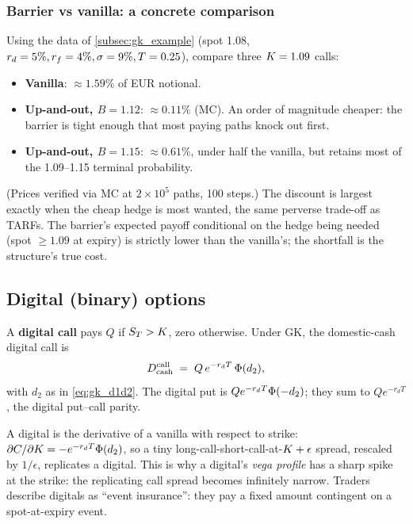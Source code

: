 \subsubsection{Barrier vs vanilla: a concrete comparison}

Using the data of \cref{subsec:gk_example}
(spot 1.08, $r_d = 5\%, r_f = 4\%, \sigma = 9\%, T = 0.25$), compare
three $K = 1.09$ calls:
\begin{itemize}
  \item \textbf{Vanilla}: $\approx 1.59\%$ of EUR notional.
  \item \textbf{Up-and-out, $B = 1.12$}: $\approx 0.11\%$ (MC).  An
    order of magnitude cheaper: the barrier is tight enough that
    most paying paths knock out first.
  \item \textbf{Up-and-out, $B = 1.15$}: $\approx 0.61\%$, under
    half the vanilla, but retains most of the 1.09--1.15
    terminal probability.
\end{itemize}
(Prices verified via MC at $2\times 10^5$ paths, 100 steps.)
The discount is largest exactly when the cheap hedge is most
wanted, the same perverse trade-off as TARFs.  The barrier's
expected payoff conditional on the hedge being needed
(spot $\geq 1.09$ at expiry) is strictly lower than the vanilla's;
the shortfall is the structure's true cost.

\subsection{Digital (binary) options}

A \textbf{digital call} pays $Q$ if $S_T > K$, zero
otherwise.  Under GK, the domestic-cash digital call is
\begin{equation}
  D^{\mathrm{call}}_{\mathrm{cash}} \;=\;
  Q \, e^{-r_d T} \, \Phi(d_2),
  \label{eq:digital_call}
\end{equation}
with $d_2$ as in \cref{eq:gk_d1d2}.  The digital put is
$Q e^{-r_d T} \Phi(-d_2)$; they sum to $Q e^{-r_d T}$, the digital
put--call parity.

\begin{intuitionbox}
A digital is the derivative of a vanilla with respect to strike:
$\partial C / \partial K = -e^{-r_d T}\Phi(d_2)$, so a tiny
long-call-short-call-at-$K + \epsilon$ spread, rescaled by
$1/\epsilon$, replicates a digital.  This is why a digital's
\emph{vega profile} has a sharp spike at the strike: the replicating
call spread becomes infinitely narrow.  Traders describe digitals as
``event insurance'': they pay a fixed amount contingent on a
spot-at-expiry event.
\end{intuitionbox}

